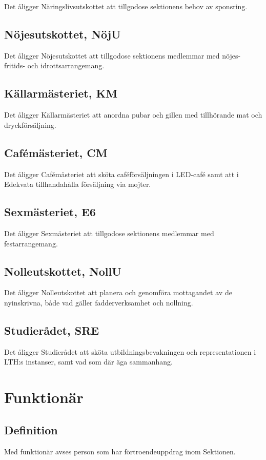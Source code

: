 \documentclass[10pt]{article}
\begin{document}
    Det åligger Näringslivsutskottet att tillgodose
    sektionens behov av sponsring.
    
    \subsection{Nöjesutskottet, NöjU}
    Det åligger Nöjesutskottet att tillgodose sektionens medlemmar med
    nöjes- fritids- och idrottsarrangemang.
    
    \subsection{Källarmästeriet, KM}
    Det åligger Källarmästeriet att anordna pubar och gillen med tillhörande mat
    och dryckförsäljning.
    
    \subsection{Cafémästeriet, CM}
    Det åligger Cafémästeriet att sköta caféförsäljningen i LED-café samt att i Edekvata tillhandahålla försäljning via mojter.
    
    \subsection{Sexmästeriet, E6}
    Det åligger Sexmästeriet att tillgodose sektionens medlemmar med
    festarrangemang.
    
    \subsection{Nolleutskottet, NollU}
    Det åligger Nolleutskottet att planera och genomföra mottagandet av
    de nyinskrivna, både vad gäller fadderverksamhet och nollning.
    
    \subsection{Studierådet, SRE}
    Det åligger Studierådet att sköta utbildningsbevakningen och representationen i LTH:s instanser, samt vad som där äga sammanhang.
    
    \newpage
    
    \section{Funktionär}
    \subsection{Definition}
    Med funktionär avses person som har förtroendeuppdrag inom Sektionen.
    
\end{document}
